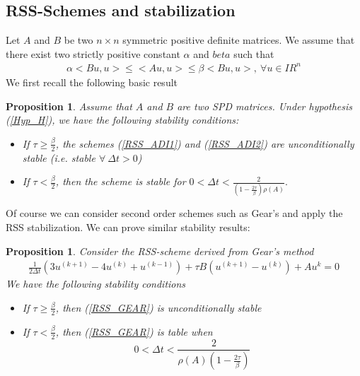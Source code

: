 \documentclass[11pt]{article}
\newcommand{\R}{I\!\!R}
\newtheorem{proposition}[theorem]{Proposition}
\newcommand{\Frac}[2] {\frac{\textstyle #1} {\textstyle #2}}
\begin{document}
\subsection{RSS-Schemes and stabilization}
Let $A$ and $B$ be two $n\times n$ symmetric positive definite matrices. We assume that there exist two strictly positive constant $\alpha$ and $beta$ such that
\begin{eqnarray}
\label{Hyp_H}
\alpha <Bu,u> \le <A u, u> \le \beta <Bu,u>, \ \forall u \in \R^n
\end{eqnarray}
We first recall the following basic  result \cite{BrachetChehabJSC}
\begin{proposition}
Assume that $A$ and $B$ are two SPD matrices.
Under hypothesis (\ref{Hyp_H}), we have the following stability conditions:
\begin{itemize}
\item If $\tau\ge \Frac{\beta}{2}$, the schemes (\ref{RSS_ADI1}) and (\ref{RSS_ADI2}) are unconditionally stable (i.e. stable $\forall \ \Delta t >0$)
\item If $\tau < \Frac{\beta}{2}$, then the scheme is stable for
$
0<\Delta t < \Frac{2}{\left(1-\Frac{2\tau}{\beta}\right)\rho(A)}.
$
\end{itemize} 
\label{RSS_Stab_lin}
\end{proposition}
Of course we can consider second order schemes such as Gear's and apply the RSS stabilization. We can prove similar stability results:
\begin{proposition}
Consider the RSS-scheme derived from Gear's method 
\begin{eqnarray*}\label{RSS_GEAR}
\Frac{1}{2\Delta t}(3u^{(k+1)}-4u^{(k)}+u^{(k-1)})
+\tau B(u^{(k+1)}-u^{(k)})+Au^k=0
\end{eqnarray*}
We have the following stability conditions
\begin{itemize}
\item If $\tau\ge \Frac{\beta}{2}$, then (\ref{RSS_GEAR}) is unconditionally stable
\item If $\tau < \Frac{\beta}{2}$, then (\ref{RSS_GEAR}) is table when
$$
0<\Delta t < \Frac{2}{\rho(A)(1-\Frac{2\tau}{\beta})}
$$
\end{itemize}
\end{proposition}
\end{document}

